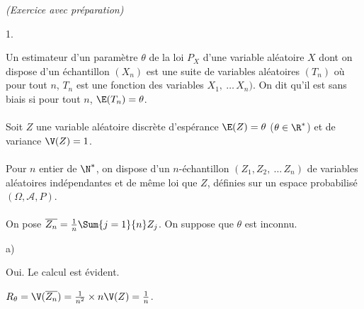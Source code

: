\documentclass[11pt]{article}%
\begin{document}
 \newpage

 \begin{exercice}{\it (Exercice avec préparation)}~
 \begin{noliste}{1.}
 \setlength{\itemsep}{4mm}
 \item Un estimateur d'un paramètre $\theta$ de la loi $P_{X}$ d'une
 variable aléatoire $X$ dont on dispose d'un échantillon $(X_{n})$
 est une suite de variables aléatoires $(T_{n})$ où pour tout $n$,
 $T_{n}$ est une fonction des variables $X_{1},\ \dots\, X_{n})$. On
 dit qu'il est sans biais si pour tout $n$, $\E(T_{n}) = \theta$. \\
 \\
 Soit $Z$ une variable aléatoire discrète d'espérance $\E(Z) = 
 \theta$ ($\theta \in \R^*$) et de variance $\V(Z) = 1$. \\
\\
 Pour $n$ entier de $\N^*$, on dispose d'un $n$-échantillon $(Z_{1},
Z_{2},\ \dots\, Z_{n})$ de variables aléatoires indépendantes et
 de même loi que $Z$, définies sur un espace probabilisé $(\Omega,
\mathcal{A}, P)$. \\
\\
 On pose $\overline{Z_{n}} = \frac{1}{n} \Sum{j = 1}{n} Z_{j}$. On
 suppose que $\theta$ est inconnu.
 \item 
 \begin{noliste}{a)}
 \setlength{\itemsep}{2mm} 
 \item Oui. Le calcul est évident. \\
 \item $R_{\theta} = \V(\overline{Z_{n}}) = \frac{1}{n^{2}} \times n
 \V(Z) = \frac{1}{n}$. \\
 \end{noliste}


\end{noliste}
\end{exercice}
\end{document}
